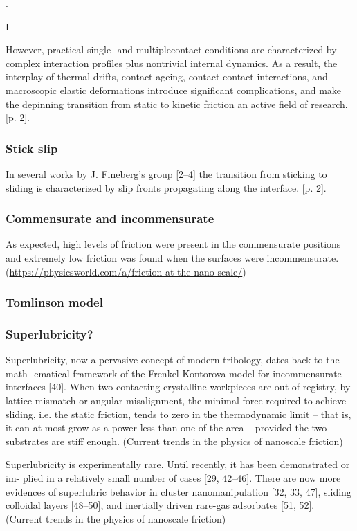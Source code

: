 \cite{mo_friction_2009}.




I



However, practical single- and multiplecontact conditions are characterized by complex interaction profiles plus nontrivial internal dynamics. As a result, the interplay of thermal drifts, contact ageing, contact-contact interactions, and macroscopic elastic deformations introduce significant complications, and make the depinning transition from static to kinetic friction an active field of research. \cite{Manini_2017}[p. 2]. 

\subsubsection{Stick slip}

In several works by J. Fineberg’s group [2–4] the transition from sticking to sliding is characterized by slip fronts propagating along the interface. \cite{Manini_2017}[p. 2]. 

\subsubsection{Commensurate and incommensurate}
As expected, high levels of friction were present in the commensurate positions and extremely low friction was found when the surfaces were incommensurate. (\url{https://physicsworld.com/a/friction-at-the-nano-scale/})


\subsubsection{Tomlinson model}
\subsubsection{Superlubricity?}
Superlubricity, now a pervasive concept of modern tribology, dates back to the math- ematical framework of the Frenkel Kontorova model for incommensurate interfaces [40]. When two contacting crystalline workpieces are out of registry, by lattice mismatch or angular misalignment, the minimal force required to achieve sliding, i.e. the static friction, tends to zero in the thermodynamic limit – that is, it can at most grow as a power less than one of the area – provided the two substrates are stiff enough. (Current trends in the physics of nanoscale friction)


Superlubricity is experimentally rare. Until recently, it has been demonstrated or im- plied in a relatively small number of cases [29, 42–46]. There are now more evidences of superlubric behavior in cluster nanomanipulation [32, 33, 47], sliding colloidal layers [48–50], and inertially driven rare-gas adsorbates [51, 52]. (Current trends in the physics of nanoscale friction)


